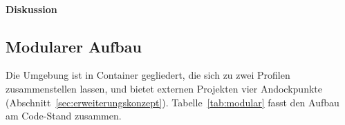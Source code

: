 \paragraph*{Diskussion}

\subsection{Modularer Aufbau}
\label{sec:eval_modular}
Die Umgebung ist in Container gegliedert, die sich zu zwei Profilen zusammenstellen lassen, und bietet externen Projekten vier Andockpunkte (Abschnitt~\ref{sec:erweiterungskonzept}).
Tabelle~\ref{tab:modular} fasst den Aufbau am Code-Stand zusammen.

